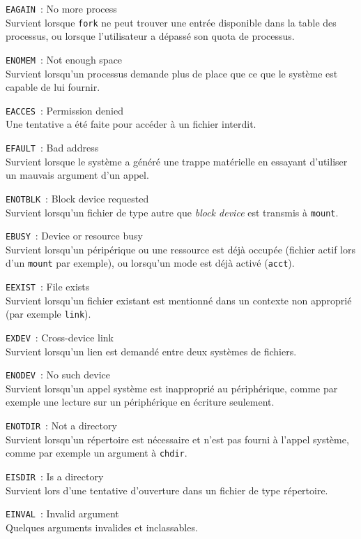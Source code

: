 \documentclass [twoside] {report}
\begin{document}
\texttt {EAGAIN}~: No more process \\
Survient lorsque \texttt {fork} ne peut trouver une
entrée disponible dans la table des processus, ou
lorsque l'utilisateur a dépassé son quota de
processus.

\texttt {ENOMEM}~: Not enough space \\
Survient lorsqu'un processus demande plus de
place que ce que le système est capable de lui
fournir.

\texttt {EACCES}~: Permission denied \\
Une tentative a été faite pour accéder à un
fichier interdit.

\texttt {EFAULT}~: Bad address \\
Survient lorsque le système a généré une trappe matérielle en
essayant d'utiliser un mauvais argument d'un
appel.

\texttt {ENOTBLK}~: Block device requested \\
Survient lorsqu'un fichier de type autre que
\textit {block device} est transmis à \texttt {mount}.

\texttt {EBUSY}~: Device or resource busy \\
Survient lorsqu'un péripérique ou une ressource
est déjà occupée (fichier actif lors d'un
\texttt {mount} par exemple), ou lorsqu'un mode est déjà
activé (\texttt {acct}).

\texttt {EEXIST}~: File exists \\
Survient lorsqu'un fichier existant est mentionné
dans un contexte non approprié (par exemple
\texttt {link}).

\texttt {EXDEV}~: Cross-device link \\
Survient lorsqu'un lien est demandé entre deux
systèmes de fichiers.

\texttt {ENODEV}~: No such device \\
Survient lorsqu'un appel système est inapproprié
au périphérique, comme par exemple une lecture sur
un périphérique en écriture seulement.

\texttt {ENOTDIR}~: Not a directory \\
Survient lorsqu'un répertoire est nécessaire et
n'est pas fourni à l'appel système, comme par
exemple un argument à \texttt {chdir}.

\texttt {EISDIR}~: Is a directory \\
Survient lors d'une tentative d'ouverture dans un
fichier de type répertoire.

\texttt {EINVAL}~: Invalid argument \\
Quelques arguments invalides et inclassables.
\end{document}
